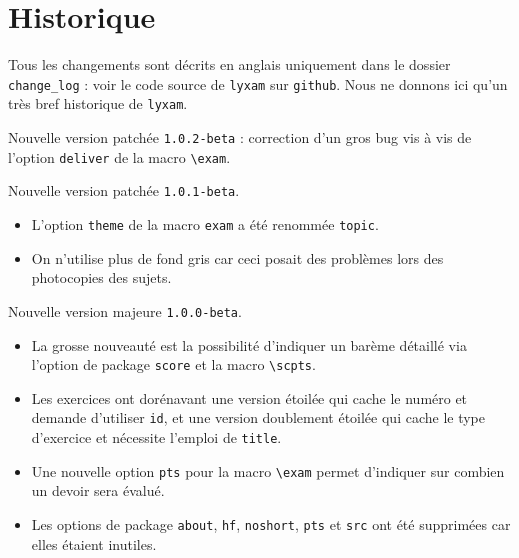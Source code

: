 \documentclass[12pt,a4paper]{scrartcl}
\begin{document}
\section{Historique}

Tous les changements sont décrits en anglais uniquement dans le dossier \verb+change_log+ : voir le code source de \verb+lyxam+ sur \verb+github+. Nous ne donnons ici qu'un très bref historique de \verb+lyxam+.

\medskip

\begin{description}[leftmargin=1em]
    \setlength\itemsep{1em}
    \item[2019-02-21] Nouvelle version patchée \verb+1.0.2-beta+ : correction d'un gros bug vis à vis de l'option \verb+deliver+ de la macro \verb+\exam+.


    \item[2019-02-16] Nouvelle version patchée \verb+1.0.1-beta+.
        \begin{itemize}
            \item L'option \verb+theme+ de la macro \verb+exam+ a été renommée \verb+topic+.

            \item On n'utilise plus de fond gris car ceci posait des problèmes lors des photocopies des sujets.
        \end{itemize}


    \item[2017-12-13] Nouvelle version majeure \verb+1.0.0-beta+.
        \begin{itemize}
            \item La grosse nouveauté est la possibilité d'indiquer un barème détaillé via l'option de package \verb+score+ et la macro \verb+\scpts+.

            \item Les exercices ont dorénavant une version étoilée qui cache le numéro et demande d'utiliser \verb+id+, et une version doublement étoilée qui cache le type d'exercice et nécessite l'emploi de \verb+title+.

            \item Une nouvelle option \verb+pts+ pour la macro \verb+\exam+ permet d'indiquer sur combien un devoir sera évalué.

            \item Les options de package \verb+about+, \verb+hf+, \verb+noshort+, \verb+pts+ et \verb+src+ ont été supprimées car elles étaient inutiles.
        \end{itemize}



\end{description}
\end{document}
